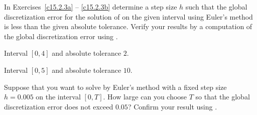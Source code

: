 \documentclass{ximera}
\begin{document}
\noindent In Exercises~\ref{c15.2.3a} -- \ref{c15.2.3b}
determine a step size $h$ such that the global discretization error
for the solution of  on the given interval using 
Euler's method is less than the given absolute tolerance.  Verify 
your results by a computation of the global discretization error 
using \Matlabp.
\begin{exercise} \label{c15.2.3a}
Interval $[0,4]$ and absolute tolerance $2$.
\end{exercise}
\begin{exercise} \label{c15.2.3b}
Interval $[0,5]$ and absolute tolerance $10$.
\end{exercise}

\begin{exercise} \label{c15.2.4}
Suppose that you want to solve  by Euler's
method with a fixed step size $h=0.005$ on the interval $[0,T]$.  
How large can you choose $T$ so that the global discretization
error does not exceed $0.05$?  Confirm your result using \Matlabp.
\end{exercise}
\end{document}
